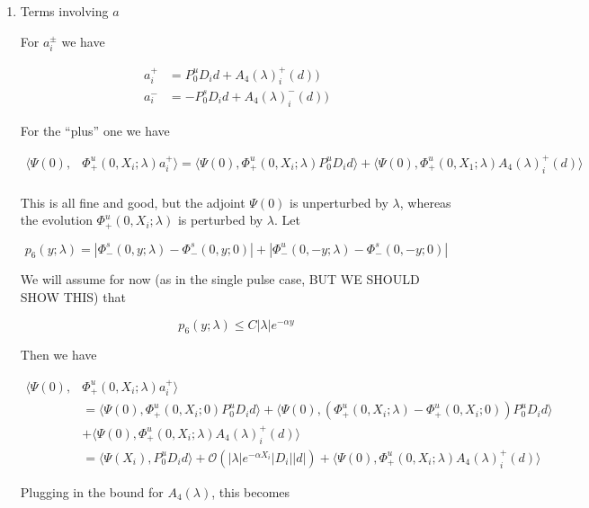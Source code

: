 \documentclass[12pt]{article}
\begin{document}
\begin{enumerate}
\item Terms involving $a$

For $a_i^\pm$ we have

\begin{align*}
a_i^+ &= P^u_0 D_i d + A_4(\lambda)_i^+(d))\\
a_i^- &= -P^s_0 D_i d + A_4(\lambda)_i^-(d))
\end{align*}

For the ``plus'' one we have

\begin{align*}
\langle \Psi(0), &\Phi^u_+(0, X_i; \lambda) a_i^+ \rangle = \langle \Psi(0), \Phi^u_+(0, X_i; \lambda) P^u_0 D_i d \rangle + \langle \Psi(0), \Phi^u_+(0, X_1; \lambda) A_4(\lambda)_i^+(d) \rangle \\
\end{align*} 

This is all fine and good, but the adjoint $\Psi(0)$ is unperturbed by $\lambda$, whereas the evolution $\Phi^u_+(0, X_i; \lambda)$ is perturbed by $\lambda$. Let

\[
p_6(y; \lambda) = |\Phi^s_-(0, y; \lambda) - \Phi^s_-(0, y; 0)| + |\Phi^u_-(0, -y; \lambda) - \Phi^s_-(0, -y; 0)| 
\]

We will assume for now (as in the single pulse case, BUT WE SHOULD SHOW THIS) that

\[
p_6(y; \lambda) \leq C |\lambda| e^{-\alpha y}
\]

Then we have

\begin{align*}
\langle \Psi(0), &\Phi^u_+(0, X_i; \lambda) a_i^+ \rangle \\
&= \langle \Psi(0), \Phi^u_+(0, X_i; 0) P^u_0 D_i d \rangle + \langle \Psi(0), (\Phi^u_+(0, X_i; \lambda) - \Phi^u_+(0, X_i; 0)) P^u_0 D_i d \rangle \\
&+ \langle \Psi(0), \Phi^u_+(0, X_i; \lambda) A_4(\lambda)_i^+(d) \rangle \\
&= \langle \Psi(X_i), P^u_0 D_i d \rangle + \mathcal{O}(|\lambda| e^{-\alpha X_i}|D_i||d|) + \langle \Psi(0), \Phi^u_+(0, X_i; \lambda) A_4(\lambda)_i^+(d) \rangle 
\end{align*}

Plugging in the bound for $A_4(\lambda)$, this becomes


\end{enumerate}
\end{document}
